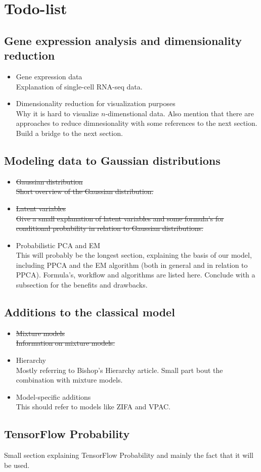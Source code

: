 \section{Todo-list}

\subsection{Gene expression analysis and dimensionality reduction}
\begin{itemize}
    \item Gene expression data\\
    Explanation of single-cell RNA-seq data.
    \item Dimensionality reduction for visualization purposes\\
    Why it is hard to visualize $n$-dimenstional data. Also mention that there are approaches to reduce dimnesionality with some references to the next section. Build a bridge to the next section.
\end{itemize}

\subsection{Modeling data to Gaussian distributions}
\begin{itemize}
    \item \sout{Gaussian distribution}\\
    \sout{Short overview of the Gaussian distribution.}
    \item \sout{Latent variables}\\
    \sout{Give a small explanation of latent variables and some formula's for conditional probability in relation to Gaussian distributions.}
    \item Probabilistic PCA and EM\\
    This will probably be the longest section, explaining the basis of our model, including PPCA and the EM algorithm (both in general and in relation to PPCA). Formula's, workflow and algorithms are listed here. Conclude with a subsection for the benefits and drawbacks.
\end{itemize}

\subsection{Additions to the classical model}
\begin{itemize}
        \item \sout{Mixture models}\\
        \sout{Information on mixture models.}
        \item Hierarchy\\
        Mostly referring to Bishop's Hierarchy article. Small part bout the combination with mixture models.
        \item Model-specific additions\\
        This should refer to models like ZIFA and VPAC.
    \end{itemize}
    \subsection{TensorFlow Probability}
    Small section explaining TensorFlow Probability and mainly the fact that it will be used.

